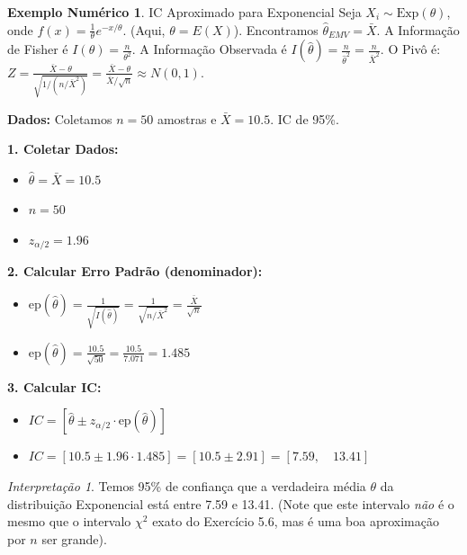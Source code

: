 \documentclass[12pt, a4paper]{article}
\theoremstyle{definition} %
\newtheorem{exemplo}{Exemplo Numérico}[section]
\theoremstyle{remark} %
\newtheorem{interpretacao}{Interpretação}[section]
\begin{document}
\begin{exemplo}{IC Aproximado para Exponencial}
    Seja $X_i \sim \text{Exp}(\theta)$, onde $f(x) = \frac{1}{\theta}e^{-x/\theta}$. (Aqui, $\theta = E(X)$).
    Encontramos $\hat{\theta}_{EMV} = \bar{X}$.
    A Informação de Fisher é $I(\theta) = \frac{n}{\theta^2}$.
    A Informação Observada é $I(\hat{\theta}) = \frac{n}{\hat{\theta}^2} = \frac{n}{\bar{X}^2}$.
    O Pivô é: $Z = \frac{\bar{X} - \theta}{\sqrt{1 / (n/\bar{X}^2)}} = \frac{\bar{X} - \theta}{\bar{X} / \sqrt{n}} \approx N(0,1)$.

    \textbf{Dados:} Coletamos $n=50$ amostras e $\bar{X}=10.5$. IC de 95\%.
    
    \textbf{1. Coletar Dados:}
    \begin{itemize}
        \item $\hat{\theta} = \bar{X} = 10.5$
        \item $n = 50$
        \item $z_{\alpha/2} = 1.96$
    \end{itemize}
    \textbf{2. Calcular Erro Padrão (denominador):}
    \begin{itemize}
        \item $\text{ep}(\hat{\theta}) = \frac{1}{\sqrt{I(\hat{\theta})}} = \frac{1}{\sqrt{n/\bar{X}^2}} = \frac{\bar{X}}{\sqrt{n}}$
        \item $\text{ep}(\hat{\theta}) = \frac{10.5}{\sqrt{50}} = \frac{10.5}{7.071} = 1.485$
    \end{itemize}
    \textbf{3. Calcular IC:}
    \begin{itemize}
        \item $IC = [ \hat{\theta} \pm z_{\alpha/2} \cdot \text{ep}(\hat{\theta}) ]$
        \item $IC = [ 10.5 \pm 1.96 \cdot 1.485 ] = [ 10.5 \pm 2.91 ] = [7.59, \quad 13.41]$
    \end{itemize}
    \begin{interpretacao}
        Temos 95\% de confiança que a verdadeira média $\theta$ da distribuição Exponencial está entre 7.59 e 13.41. (Note que este intervalo \textit{não} é o mesmo que o intervalo $\chi^2$ exato do Exercício 5.6, mas é uma boa aproximação por $n$ ser grande).
    \end{interpretacao}
\end{exemplo}

\newpage
\end{document}
